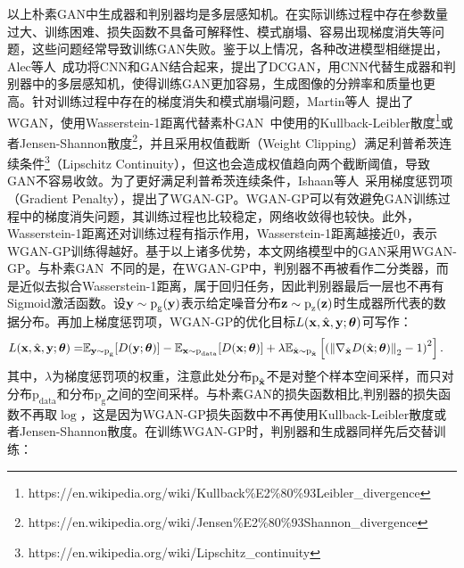 以上朴素GAN中生成器和判别器均是多层感知机。在实际训练过程中存在参数量过大、训练困难、损失函数不具备可解释性、模式崩塌、容易出现梯度消失等问题，这些问题经常导致训练GAN失败。鉴于以上情况，各种改进模型相继提出，Alec等人~\cite{radford2015unsupervised}成功将CNN和GAN结合起来，提出了DCGAN，用CNN代替生成器和判别器中的多层感知机，使得训练GAN更加容易，生成图像的分辨率和质量也更高。针对训练过程中存在的梯度消失和模式崩塌问题，Martin等人~\cite{arjovsky2017wasserstein}提出了WGAN，使用Wasserstein-1距离代替素朴GAN~\cite{goodfellow2014generative}中使用的Kullback-Leibler散度\footnote{https://en.wikipedia.org/wiki/Kullback\%E2\%80\%93Leibler\_divergence}或者Jensen-Shannon散度\footnote{https://en.wikipedia.org/wiki/Jensen\%E2\%80\%93Shannon\_divergence}，并且采用权值截断（Weight Clipping）满足利普希茨连续条件\footnote{https://en.wikipedia.org/wiki/Lipschitz\_continuity}（Lipschitz Continuity），但这也会造成权值趋向两个截断阈值，导致GAN不容易收敛。为了更好满足利普希茨连续条件，Ishaan等人~\cite{gulrajani2017improved}采用梯度惩罚项（Gradient Penalty），提出了WGAN-GP。WGAN-GP可以有效避免GAN训练过程中的梯度消失问题，其训练过程也比较稳定，网络收敛得也较快。此外，Wasserstein-1距离还对训练过程有指示作用，Wasserstein-1距离越接近0，表示WGAN-GP训练得越好。基于以上诸多优势，本文网络模型中的GAN采用WGAN-GP。与朴素GAN~\cite{goodfellow2014generative}不同的是，在WGAN-GP中，判别器不再被看作二分类器，而是近似去拟合Wasserstein-1距离，属于回归任务，因此判别器最后一层也不再有Sigmoid激活函数。设$\mathbf{y}\sim \text{p}_\text{g}(\mathbf{y})$表示给定噪音分布$\mathbf{z}\sim \text{p}_{\text{z}}(\mathbf{z})$时生成器所代表的数据分布。再加上梯度惩罚项，WGAN-GP的优化目标$L(\mathbf{x},\hat{\mathbf{x}},\mathbf{y};\mbox{\boldmath $\theta$})$可写作：
\begin{equation}\label{wgan_gp_loss_func}
  \begin{aligned}
	L(\mathbf{x},\hat{\mathbf{x}},\mathbf{y};\mbox{\boldmath $\theta$})=&\mathbb{E}_{\mathbf{y} \sim \text{p}_{\text{g}}}[D(\mathbf{y};\mbox{\boldmath $\theta$})]-\mathbb{E}_{\mathbf{x} \sim \text{p}_{\text{data}}}[D(\mathbf{x};\mbox{\boldmath $\theta$})] +\lambda \mathbb{E}_{\hat{\mathbf{x}} \sim \text{p}_{\hat{\mathbf{x}}}}\left[\left(\left\|\nabla_{\hat{\mathbf{x}}}D(\hat{\mathbf{x}};\mbox{\boldmath $\theta$})\right\|_{2}-1\right)^{2}\right].
  \end{aligned}
\end{equation}
其中，$\lambda$为梯度惩罚项的权重，注意此处分布$\text{p}_{\hat{\mathbf{x}}}$不是对整个样本空间采样，而只对分布$\text{p}_{\text{data}}$和分布$\text{p}_{\text{g}}$之间的空间采样。与朴素GAN的损失函数相比,判别器的损失函数不再取$\log$，这是因为WGAN-GP损失函数中不再使用Kullback-Leibler散度或者Jensen-Shannon散度。在训练WGAN-GP时，判别器和生成器同样先后交替训练：

